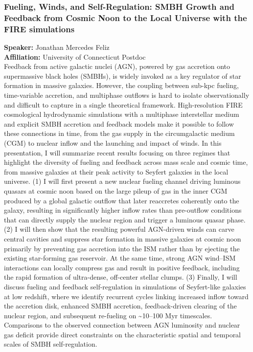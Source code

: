 \subsubsection*{Fueling, Winds, and Self-Regulation: SMBH Growth and Feedback from Cosmic Noon to the Local Universe with the FIRE simulations}
\textbf{Speaker:} Jonathan Mercedes Feliz \\
\textbf{Affiliation:} University of Connecticut \textperiodcentered{} Postdoc\\
Feedback from active galactic nuclei (AGN), powered by gas accretion onto supermassive black holes (SMBHs), is widely invoked as a key regulator of star formation in massive galaxies. However, the coupling between sub-kpc fueling, time-variable accretion, and multiphase outflows is hard to isolate observationally and difficult to capture in a single theoretical framework. High-resolution FIRE cosmological hydrodynamic simulations with a multiphase interstellar medium and explicit SMBH accretion and feedback models make it possible to follow these connections in time, from the gas supply in the circumgalactic medium (CGM) to nuclear inflow and the launching and impact of winds. In this presentation, I will summarize recent results focusing on three regimes that highlight the diversity of fueling and feedback across mass scale and cosmic time, from massive galaxies at their peak activity to Seyfert galaxies in the local universe. (1) I will first present a new nuclear fueling channel driving luminous quasars at cosmic noon based on the large pileup of gas in the inner CGM produced by a global galactic outflow that later reaccretes coherently onto the galaxy, resulting in significantly higher inflow rates than pre-outflow conditions that can directly supply the nuclear region and trigger a luminous quasar phase.  (2) I will then show that the resulting powerful AGN-driven winds can carve central cavities and suppress star formation in massive galaxies at cosmic noon primarily by preventing gas accretion into the ISM rather than by ejecting the existing star-forming gas reservoir. At the same time, strong AGN wind–ISM interactions can locally compress gas and result in positive feedback, including the rapid formation of ultra-dense, off-center stellar clumps. (3) Finally, I will discuss fueling and feedback self-regulation in simulations of Seyfert-like galaxies at low redshift, where we identify recurrent cycles linking increased inflow toward the accretion disk, enhanced SMBH accretion, feedback-driven clearing of the nuclear region, and subsequent re-fueling on \textasciitilde{}10–100 Myr timescales. Comparisons to the observed connection between AGN luminosity and nuclear gas deficit provide direct constraints on the characteristic spatial and temporal scales of SMBH self-regulation.

